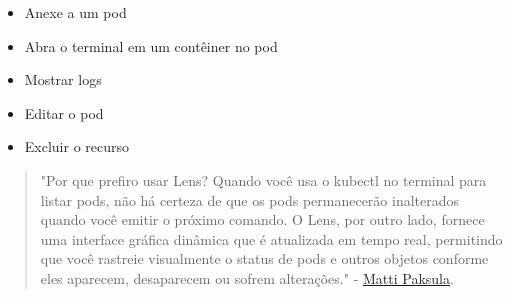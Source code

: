 \documentclass[11pt,a4paper]{article}
\begin{document}
\begin{itemize}
    \item Anexe a um pod
    \item Abra o terminal em um contêiner no pod
    \item Mostrar logs
    \item Editar o pod
    \item Excluir o recurso
\end{itemize}

\begin{quote}
"Por que prefiro usar Lens? Quando você usa o kubectl no terminal para listar pods, não há certeza de que os pods permanecerão inalterados quando você emitir o próximo comando. O Lens, por outro lado, fornece uma interface gráfica dinâmica que é atualizada em tempo real, permitindo que você rastreie visualmente o status de pods e outros objetos conforme eles aparecem, desaparecem ou sofrem alterações." - \href{http://github.com/matti}{Matti Paksula}.
\end{quote}
\end{document}
